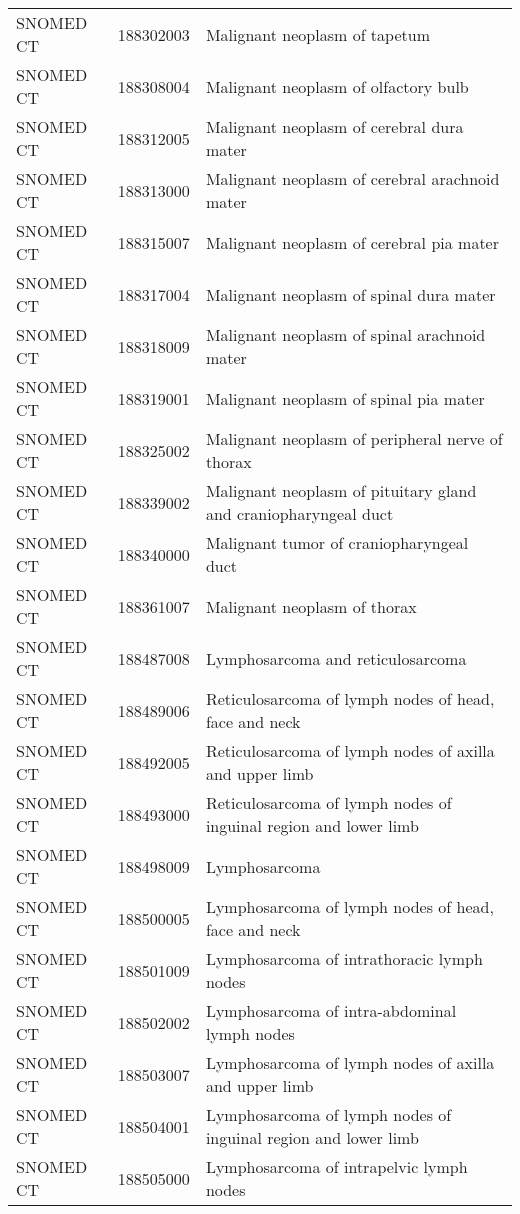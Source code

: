 \begin{longtable}{p{}p{}p{}}
  SNOMED CT & 188302003 & Malignant neoplasm of tapetum \\ 
  SNOMED CT & 188308004 & Malignant neoplasm of olfactory bulb \\ 
  SNOMED CT & 188312005 & Malignant neoplasm of cerebral dura mater \\ 
  SNOMED CT & 188313000 & Malignant neoplasm of cerebral arachnoid mater \\ 
  SNOMED CT & 188315007 & Malignant neoplasm of cerebral pia mater \\ 
  SNOMED CT & 188317004 & Malignant neoplasm of spinal dura mater \\ 
  SNOMED CT & 188318009 & Malignant neoplasm of spinal arachnoid mater \\ 
  SNOMED CT & 188319001 & Malignant neoplasm of spinal pia mater \\ 
  SNOMED CT & 188325002 & Malignant neoplasm of peripheral nerve of thorax \\ 
  SNOMED CT & 188339002 & Malignant neoplasm of pituitary gland and craniopharyngeal duct \\ 
  SNOMED CT & 188340000 & Malignant tumor of craniopharyngeal duct \\ 
  SNOMED CT & 188361007 & Malignant neoplasm of thorax \\ 
  SNOMED CT & 188487008 & Lymphosarcoma and reticulosarcoma \\ 
  SNOMED CT & 188489006 & Reticulosarcoma of lymph nodes of head, face and neck \\ 
  SNOMED CT & 188492005 & Reticulosarcoma of lymph nodes of axilla and upper limb \\ 
  SNOMED CT & 188493000 & Reticulosarcoma of lymph nodes of inguinal region and lower limb \\ 
  SNOMED CT & 188498009 & Lymphosarcoma \\ 
  SNOMED CT & 188500005 & Lymphosarcoma of lymph nodes of head, face and neck \\ 
  SNOMED CT & 188501009 & Lymphosarcoma of intrathoracic lymph nodes \\ 
  SNOMED CT & 188502002 & Lymphosarcoma of intra-abdominal lymph nodes \\ 
  SNOMED CT & 188503007 & Lymphosarcoma of lymph nodes of axilla and upper limb \\ 
  SNOMED CT & 188504001 & Lymphosarcoma of lymph nodes of inguinal region and lower limb \\ 
  SNOMED CT & 188505000 & Lymphosarcoma of intrapelvic lymph nodes \\ 

\end{longtable}
